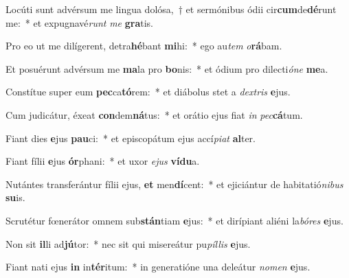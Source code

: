 \item Locúti sunt advérsum me lingua dolósa,~† et sermónibus ódii cir\textbf{cum}de\textbf{dé}runt me:~* et expugnavé\textit{runt} \textit{me} \textbf{gra}tis.
\item Pro eo ut me dilígerent, detra\textbf{hé}bant \textbf{mi}hi:~* ego au\textit{tem} \textit{o}\textbf{rá}bam.
\item Et posuérunt advérsum me \textbf{ma}la pro \textbf{bo}nis:~* et ódium pro dilecti\textit{ó}\textit{ne} \textbf{me}a.
\item Constítue super eum \textbf{pec}ca\textbf{tó}rem:~* et diábolus stet a \textit{dex}\textit{tris} \textbf{e}jus.
\item Cum judicátur, éxeat \textbf{con}dem\textbf{ná}tus:~* et orátio ejus fiat \textit{in} \textit{pec}\textbf{cá}tum.
\item Fiant dies \textbf{e}jus \textbf{pau}ci:~* et episcopátum ejus accí\textit{pi}\textit{at} \textbf{al}ter.
\item Fiant fílii \textbf{e}jus \textbf{ór}phani:~* et uxor \textit{e}\textit{jus} \textbf{ví}\textbf{du}a.
\item Nutántes transferántur fílii ejus, \textbf{et} men\textbf{dí}cent:~* et ejiciántur de habitatió\textit{ni}\textit{bus} \textbf{su}is.
\item Scrutétur fœnerátor omnem sub\textbf{stán}tiam \textbf{e}jus:~* et dirípiant aliéni la\textit{bó}\textit{res} \textbf{e}jus.
\item Non sit \textbf{il}li ad\textbf{jú}tor:~* nec sit qui misereátur pu\textit{píl}\textit{lis} \textbf{e}jus.
\item Fiant nati ejus \textbf{in} in\textbf{tér}itum:~* in generatióne una deleátur \textit{no}\textit{men} \textbf{e}jus.
